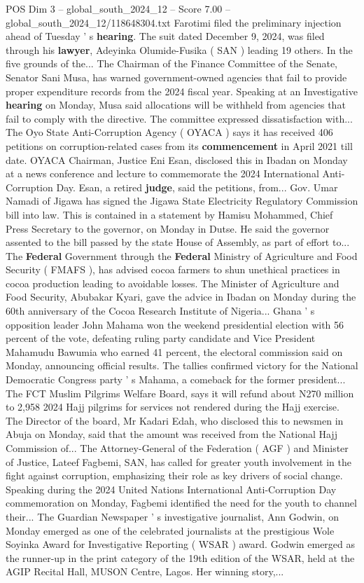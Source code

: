 \begin{textsample}{POS Dim 3 – global\_south\_2024\_12 – Score 7.00 – global\_south\_2024\_12/118648304.txt}
Farotimi filed the preliminary injection ahead of Tuesday ' s \textbf{hearing}.
The suit dated December 9, 2024, was filed through his \textbf{lawyer}, Adeyinka Olumide-Fusika ( SAN ) leading 19 others.
In the five grounds of the...
The Chairman of the Finance Committee of the Senate, Senator Sani Musa, has warned government-owned agencies that fail to provide proper expenditure records from the 2024 fiscal year.
Speaking at an Investigative \textbf{hearing} on Monday, Musa said allocations will be withheld from agencies that fail to comply with the directive.
The committee expressed dissatisfaction with...
The Oyo State Anti-Corruption Agency ( OYACA ) says it has received 406 petitions on corruption-related cases from its \textbf{commencement} in April 2021 till date.
OYACA Chairman, Justice Eni Esan, disclosed this in Ibadan on Monday at a news conference and lecture to commemorate the 2024 International Anti-Corruption Day.
Esan, a retired \textbf{judge}, said the petitions, from...
Gov.
Umar Namadi of Jigawa has signed the Jigawa State Electricity Regulatory Commission bill into law.
This is contained in a statement by Hamisu Mohammed, Chief Press Secretary to the governor, on Monday in Dutse.
He said the governor assented to the bill passed by the state House of Assembly, as part of effort to...
The \textbf{Federal} Government through the \textbf{Federal} Ministry of Agriculture and Food Security ( FMAFS ), has advised cocoa farmers to shun unethical practices in cocoa production leading to avoidable losses.
The Minister of Agriculture and Food Security, Abubakar Kyari, gave the advice in Ibadan on Monday during the 60th anniversary of the Cocoa Research Institute of Nigeria...
Ghana ' s opposition leader John Mahama won the weekend presidential election with 56 percent of the vote, defeating ruling party candidate and Vice President Mahamudu Bawumia who earned 41 percent, the electoral commission said on Monday, announcing official results.
The tallies confirmed victory for the National Democratic Congress party ' s Mahama, a comeback for the former president...
The FCT Muslim Pilgrims Welfare Board, says it will refund about N270 million to 2,958 2024 Hajj pilgrims for services not rendered during the Hajj exercise.
The Director of the board, Mr Kadari Edah, who disclosed this to newsmen in Abuja on Monday, said that the amount was received from the National Hajj Commission of...
The Attorney-General of the Federation ( AGF ) and Minister of Justice, Lateef Fagbemi, SAN, has called for greater youth involvement in the fight against corruption, emphasizing their role as key drivers of social change.
Speaking during the 2024 United Nations International Anti-Corruption Day commemoration on Monday, Fagbemi identified the need for the youth to channel their...
The Guardian Newspaper ' s investigative journalist, Ann Godwin, on Monday emerged as one of the celebrated journalists at the prestigious Wole Soyinka Award for Investigative Reporting ( WSAR ) award.
Godwin emerged as the runner-up in the print category of the 19th edition of the WSAR, held at the AGIP Recital Hall, MUSON Centre, Lagos.
Her winning story,...


\end{textsample}
